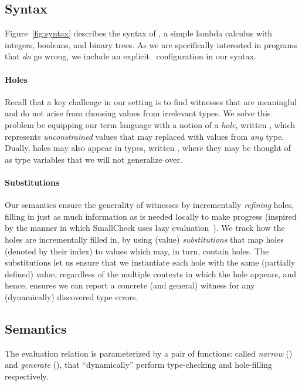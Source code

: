 \subsection{Syntax}
\label{sec:syntax}

%
Figure~\ref{fig:syntax} describes the syntax of \lang, a simple lambda
calculus with integers, booleans, and binary trees.
%
As we are specifically interested in programs that \emph{do} go wrong,
we include an explicit \stuck\ configuration in our syntax.

\paragraph{Holes}
\label{sec:holes}
%
Recall that a key challenge in our setting is to find witnesses
that are meaningful and do not arise from choosing values from
irrelevant types.
%
We solve this problem be equipping our term language with a notion
of a \emph{hole}, written \ehole, which represents \emph{unconstrained}
values that may replaced with values from \emph{any} type.
%
Dually, holes may also appear in types, written \thole, where they may
be thought of as type variables that we will not generalize over.
%

\paragraph{Substitutions}
%
Our semantics ensure the generality of witnesses by incrementally
\emph{refining} holes, filling in just as much information as is
needed locally to make progress (inspired by the manner in
which SmallCheck uses lazy evaluation~\cite{runciman_smallcheck_2008}).
%
We track how the holes are incrementally filled in, by using
(value) \emph{substitutions} that map holes (denoted by their index)
to values which may, in turn, contain holes.
%
The substitutions let us ensure that we instantiate each hole
with the same (partially defined) value, regardless of the multiple
contexts in which the hole appears, and hence, ensures we can
report a concrete (and general) witness for any (dynamically)
discovered type errors.

\subsection{Semantics}
\label{sec:semantics}
%

The evaluation relation is parameterized by a pair of functions:
called \emph{narrow} (\forcesym) and \emph{generate} (\gensym),
that ``dynamically'' perform type-checking and hole-filling
respectively.

